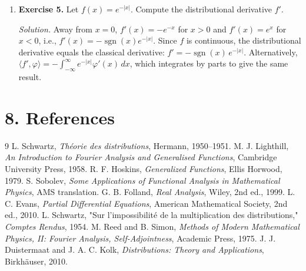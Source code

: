 \begin{enumerate}[leftmargin=*,itemsep=0.9em]
\item \textbf{Exercise 5.} Let $f(x)=e^{-|x|}$. Compute the distributional derivative $f'$.

\emph{Solution.} Away from $x=0$, $f'(x)=-e^{-x}$ for $x>0$ and $f'(x)=e^{x}$ for $x<0$, i.e., $f'(x)=-\operatorname{sgn}(x)e^{-|x|}$. Since $f$ is continuous, the distributional derivative equals the classical derivative: $f'=-\operatorname{sgn}(x)\,e^{-|x|}$. Alternatively, $\langle f',\varphi\rangle=-\int_{-\infty}^{\infty}e^{-|x|}\varphi'(x)\,dx$, which integrates by parts to give the same result.

\end{enumerate}
\section*{8. References}


\begin{thebibliography}{9}
 L. Schwartz, \emph{Théorie des distributions}, Hermann, 1950--1951.
 M. J. Lighthill, \emph{An Introduction to Fourier Analysis and Generalised Functions}, Cambridge University Press, 1958.
 R. F. Hoskins, \emph{Generalized Functions}, Ellis Horwood, 1979.
 S. Sobolev, \emph{Some Applications of Functional Analysis in Mathematical Physics}, AMS translation.
 G. B. Folland, \emph{Real Analysis}, Wiley, 2nd ed., 1999.
 L. C. Evans, \emph{Partial Differential Equations}, American Mathematical Society, 2nd ed., 2010.
 L. Schwartz, "Sur l'impossibilité de la multiplication des distributions," \emph{Comptes Rendus}, 1954.
 M. Reed and B. Simon, \emph{Methods of Modern Mathematical Physics, II: Fourier Analysis, Self-Adjointness}, Academic Press, 1975.
 J. J. Duistermaat and J. A. C. Kolk, \emph{Distributions: Theory and Applications}, Birkhäuser, 2010.
\end{thebibliography}
